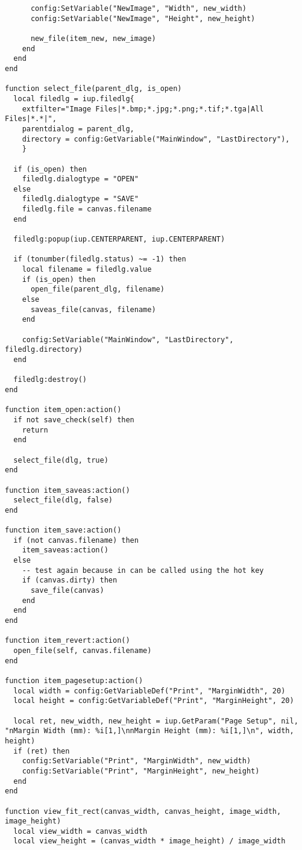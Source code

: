 \documentclass{ctexart}
\begin{document}
\begin{lstlisting}
      config:SetVariable("NewImage", "Width", new_width)
      config:SetVariable("NewImage", "Height", new_height)

      new_file(item_new, new_image)
    end
  end
end

function select_file(parent_dlg, is_open)
  local filedlg = iup.filedlg{
    extfilter="Image Files|*.bmp;*.jpg;*.png;*.tif;*.tga|All Files|*.*|",
    parentdialog = parent_dlg,
    directory = config:GetVariable("MainWindow", "LastDirectory"),
    }
    
  if (is_open) then
    filedlg.dialogtype = "OPEN"
  else
    filedlg.dialogtype = "SAVE"
    filedlg.file = canvas.filename
  end

  filedlg:popup(iup.CENTERPARENT, iup.CENTERPARENT)
  
  if (tonumber(filedlg.status) ~= -1) then
    local filename = filedlg.value
    if (is_open) then
      open_file(parent_dlg, filename)
    else
      saveas_file(canvas, filename)    
    end

    config:SetVariable("MainWindow", "LastDirectory", filedlg.directory)
  end
  
  filedlg:destroy()
end

function item_open:action()
  if not save_check(self) then
    return
  end

  select_file(dlg, true)
end

function item_saveas:action()
  select_file(dlg, false)
end

function item_save:action()
  if (not canvas.filename) then
    item_saveas:action()
  else
    -- test again because in can be called using the hot key
    if (canvas.dirty) then
      save_file(canvas)
    end
  end
end

function item_revert:action()
  open_file(self, canvas.filename)
end

function item_pagesetup:action()
  local width = config:GetVariableDef("Print", "MarginWidth", 20)
  local height = config:GetVariableDef("Print", "MarginHeight", 20)

  local ret, new_width, new_height = iup.GetParam("Page Setup", nil, "nMargin Width (mm): %i[1,]\nnMargin Height (mm): %i[1,]\n", width, height)
  if (ret) then
    config:SetVariable("Print", "MarginWidth", new_width)
    config:SetVariable("Print", "MarginHeight", new_height)
  end
end

function view_fit_rect(canvas_width, canvas_height, image_width, image_height)
  local view_width = canvas_width
  local view_height = (canvas_width * image_height) / image_width


\end{lstlisting}
\end{document}
